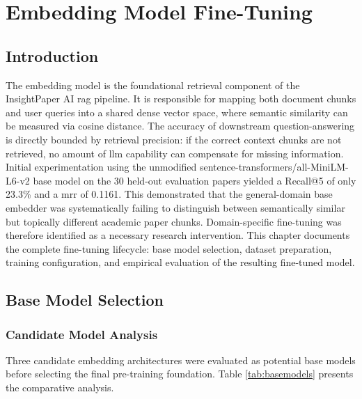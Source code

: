\chapter{Embedding Model Fine-Tuning}

\section{Introduction}

The embedding model is the foundational retrieval component of the InsightPaper AI \gls{rag} pipeline. It is responsible for mapping both document chunks and user queries into a shared dense vector space, where semantic similarity can be measured via cosine distance. The accuracy of downstream question-answering is directly bounded by retrieval precision: if the correct context chunks are not retrieved, no amount of \gls{llm} capability can compensate for missing information.
\newline \newline Initial experimentation using the unmodified sentence-transformers/all-MiniLM-L6-v2 base model on the 30 held-out evaluation papers yielded a Recall@5 of only 23.3\% and a \gls{mrr} of 0.1161. This demonstrated that the general-domain base embedder was systematically failing to distinguish between semantically similar but topically different academic paper chunks. Domain-specific fine-tuning was therefore identified as a necessary research intervention.
\newline \newline This chapter documents the complete fine-tuning lifecycle: base model selection, dataset preparation, training configuration, and empirical evaluation of the resulting fine-tuned model.

\section{Base Model Selection}

\subsection{Candidate Model Analysis}

Three candidate embedding architectures were evaluated as potential base models before selecting the final pre-training foundation. Table \ref{tab:basemodels} presents the comparative analysis.

